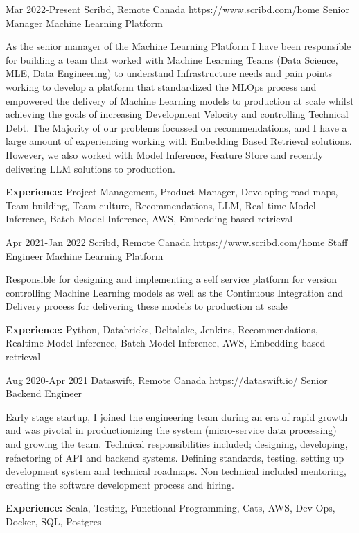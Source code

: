 \documentclass{article}
\begin{document}
\begin{job}
{Mar 2022-}{Present}
{Scribd, Remote Canada}
{https://www.scribd.com/home}
{Senior Manager Machine Learning Platform}%
{As the senior manager of the Machine Learning Platform I have been responsible for building a team that worked with Machine Learning Teams (Data Science, MLE, Data Engineering) to understand Infrastructure needs and pain points working to develop a platform that standardized the MLOps process and empowered the delivery of Machine Learning models to production at scale whilst achieving the goals of increasing Development Velocity and controlling Technical Debt. The Majority of our problems focussed on recommendations, and I have a large amount of experiencing working with Embedding Based Retrieval solutions. However, we also worked with Model Inference, Feature Store and recently delivering LLM solutions to production. \\
\rule{0mm}{5mm}\textbf{Experience:} Project Management, Product Manager, Developing road maps, Team building, Team culture, Recommendations, LLM, Real-time Model Inference, Batch Model Inference, AWS, Embedding based retrieval }
\end{job}


\begin{job}
{Apr 2021-}{Jan 2022}
{Scribd, Remote Canada}
{https://www.scribd.com/home}
{Staff Engineer Machine Learning Platform}%
{Responsible for designing and implementing a self service platform for version controlling Machine Learning models as well as the Continuous Integration and Delivery process for delivering these models to production at scale \\
\rule{0mm}{5mm}\textbf{Experience:} Python, Databricks, Deltalake, Jenkins, Recommendations, Realtime Model Inference, Batch Model Inference, AWS, Embedding based retrieval }
\end{job}


\begin{job}
{Aug 2020-}{Apr 2021}
{Dataswift, Remote Canada}
{https://dataswift.io/}
{Senior Backend Engineer}%
{Early stage startup, I joined the engineering team during an era of rapid growth and was pivotal in productionizing the system (micro-service data processing) and growing the team. Technical responsibilities included; designing, developing, refactoring of API and backend systems. Defining standards, testing, setting up development system and technical roadmaps. Non technical included  mentoring, creating the software development process and hiring.  \\
\rule{0mm}{5mm}\textbf{Experience:} Scala, Testing, Functional Programming, Cats, AWS, Dev Ops, Docker, SQL, Postgres}
\end{job}
\end{document}
